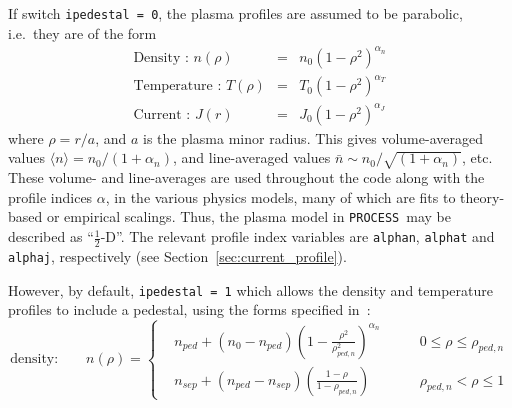 \documentclass[11pt,a4paper]{report}
\newcommand{\process}{\mbox{\texttt{PROCESS}}}
\begin{document}
If switch \texttt{ipedestal = 0}, the plasma profiles are assumed to be
parabolic, i.e.\ they are of the form
\begin{eqnarray}
\mbox{Density : } n(\rho) & = & n_0 \left( 1 - \rho^2 \right)^{\alpha_n} \\
\mbox{Temperature : } T(\rho) & = & T_0 \left( 1 - \rho^2 \right)^{\alpha_T} \\
\mbox{Current : } J(r) & = & J_0 \left( 1 - \rho^2 \right)^{\alpha_J}
\end{eqnarray}
where $\rho = r/a$, and $a$ is the plasma minor radius. This gives
volume-averaged values $\langle n \rangle = n_0 / (1+\alpha_n)$, and
line-averaged values $\bar{n} \sim n_0 / \sqrt{(1+\alpha_n)}$, etc.  These
volume- and line-averages are used throughout the code along with the profile
indices $\alpha$, in the various physics models, many of which are fits to
theory-based or empirical scalings. Thus, the plasma model in \process\ may
be described as ``$\frac{1}{2}$-D''.  The relevant profile index variables are
\texttt{alphan}, \texttt{alphat} and \texttt{alphaj}, respectively (see
Section~\ref{sec:current_profile}).

However, by default, \texttt{ipedestal = 1} which allows the density and
temperature profiles to include a pedestal, using the forms specified
in~\cite{helios}:
\begin{equation}
\mbox{density:} \qquad n(\rho) = \left\{ 
\begin{aligned}
  &n_{ped} + (n_0 - n_{ped}) \left( 1 -
    \frac{\rho^2}{\rho_{ped,n}^2}\right)^{\alpha_n}
  &\qquad 0 \leq \rho \leq \rho_{ped,n} \\
  &n_{sep} + (n_{ped} - n_{sep})\left( \frac{1- \rho}{1-\rho_{ped,n}}\right)
  &\qquad \rho_{ped,n} < \rho \leq 1
\end{aligned}
\right.
\end{equation}
\end{document}
